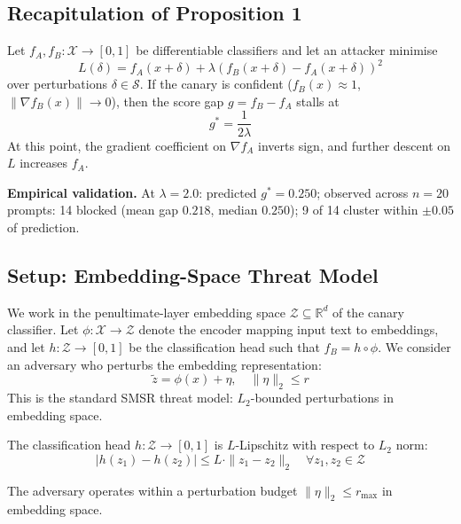 \subsection{Recapitulation of Proposition 1}

\begin{proposition}
\label{prop:div-min-restated}
Let $f_A, f_B: \mathcal{X} \to [0,1]$ be differentiable classifiers and let an attacker minimise
\[
L(\delta) = f_A(x + \delta) + \lambda(f_B(x + \delta) - f_A(x + \delta))^2
\]
over perturbations $\delta \in \mathcal{S}$. If the canary is confident ($f_B(x) \approx 1$, $\|\nabla f_B(x)\| \to 0$), then the score gap $g = f_B - f_A$ stalls at
\[
g^* = \frac{1}{2\lambda}
\]
At this point, the gradient coefficient on $\nabla f_A$ inverts sign, and further descent on $L$ increases $f_A$.
\end{proposition}

\noindent\textbf{Empirical validation.} At $\lambda = 2.0$: predicted $g^* = 0.250$; observed across $n = 20$ prompts: 14 blocked (mean gap $0.218$, median $0.250$); 9 of 14 cluster within $\pm 0.05$ of prediction.

\subsection{Setup: Embedding-Space Threat Model}

We work in the penultimate-layer embedding space $\mathcal{Z} \subseteq \mathbb{R}^d$ of the canary classifier. Let $\phi: \mathcal{X} \to \mathcal{Z}$ denote the encoder mapping input text to embeddings, and let $h: \mathcal{Z} \to [0,1]$ be the classification head such that $f_B = h \circ \phi$. We consider an adversary who perturbs the embedding representation:
\[
\tilde{z} = \phi(x) + \eta, \quad \|\eta\|_2 \leq r
\]
This is the standard SMSR threat model: $L_2$-bounded perturbations in embedding space.

\begin{assumption}
\label{ass:lipschitz}
The classification head $h: \mathcal{Z} \to [0,1]$ is $L$-Lipschitz with respect to $L_2$ norm:
\[
|h(z_1) - h(z_2)| \leq L \cdot \|z_1 - z_2\|_2 \quad \forall z_1, z_2 \in \mathcal{Z}
\]
\end{assumption}

\begin{assumption}
\label{ass:bounded}
The adversary operates within a perturbation budget $\|\eta\|_2 \leq r_{\max}$ in embedding space.
\end{assumption}

